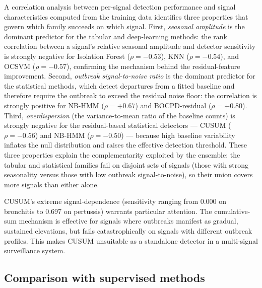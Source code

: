 \documentclass[11pt]{article}
\begin{document}
A correlation analysis between per-signal detection performance and signal characteristics computed from the training data identifies three properties that govern which family succeeds on which signal. First, \textit{seasonal amplitude} is the dominant predictor for the tabular and deep-learning methods: the rank correlation between a signal's relative seasonal amplitude and detector sensitivity is strongly negative for Isolation Forest ($\rho = -0.53$), KNN ($\rho = -0.54$), and OCSVM ($\rho = -0.57$), confirming the mechanism behind the residual-feature improvement. Second, \textit{outbreak signal-to-noise ratio} is the dominant predictor for the statistical methods, which detect departures from a fitted baseline and therefore require the outbreak to exceed the residual noise floor: the correlation is strongly positive for NB-HMM ($\rho = +0.67$) and BOCPD-residual ($\rho = +0.80$). Third, \textit{overdispersion} (the variance-to-mean ratio of the baseline counts) is strongly negative for the residual-based statistical detectors --- CUSUM ($\rho = -0.56$) and NB-HMM ($\rho = -0.50$) --- because high baseline variability inflates the null distribution and raises the effective detection threshold. These three properties explain the complementarity exploited by the ensemble: the tabular and statistical families fail on disjoint sets of signals (those with strong seasonality versus those with low outbreak signal-to-noise), so their union covers more signals than either alone.

CUSUM's extreme signal-dependence (sensitivity ranging from 0.000 on bronchitis to 0.697 on pertussis) warrants particular attention. The cumulative-sum mechanism is effective for signals where outbreaks manifest as gradual, sustained elevations, but fails catastrophically on signals with different outbreak profiles. This makes CUSUM unsuitable as a standalone detector in a multi-signal surveillance system.

\subsection{Comparison with supervised methods}
\end{document}
